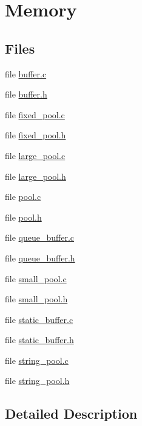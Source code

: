 \hypertarget{group__memory}{\section{Memory}
\label{group__memory}
}
\subsection*{Files}
\begin{DoxyCompactItemize}
\item 
file \hyperlink{buffer_8c}{buffer.\-c}
\item 
file \hyperlink{buffer_8h}{buffer.\-h}
\item 
file \hyperlink{fixed__pool_8c}{fixed\-\_\-pool.\-c}
\item 
file \hyperlink{fixed__pool_8h}{fixed\-\_\-pool.\-h}
\item 
file \hyperlink{large__pool_8c}{large\-\_\-pool.\-c}
\item 
file \hyperlink{large__pool_8h}{large\-\_\-pool.\-h}
\item 
file \hyperlink{pool_8c}{pool.\-c}
\item 
file \hyperlink{pool_8h}{pool.\-h}
\item 
file \hyperlink{queue__buffer_8c}{queue\-\_\-buffer.\-c}
\item 
file \hyperlink{queue__buffer_8h}{queue\-\_\-buffer.\-h}
\item 
file \hyperlink{small__pool_8c}{small\-\_\-pool.\-c}
\item 
file \hyperlink{small__pool_8h}{small\-\_\-pool.\-h}
\item 
file \hyperlink{static__buffer_8c}{static\-\_\-buffer.\-c}
\item 
file \hyperlink{static__buffer_8h}{static\-\_\-buffer.\-h}
\item 
file \hyperlink{string__pool_8c}{string\-\_\-pool.\-c}
\item 
file \hyperlink{string__pool_8h}{string\-\_\-pool.\-h}
\end{DoxyCompactItemize}


\subsection{Detailed Description}
